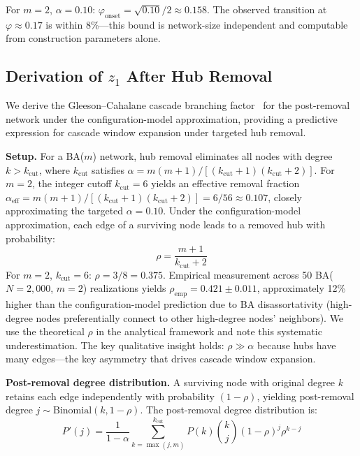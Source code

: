 \documentclass[aps,pre,twocolumn,superscriptaddress,showpacs]{revtex4-2}
\newcommand{\kcut}{k_{\text{cut}}}
\begin{document}
For $m=2$, $\alpha=0.10$: $\varphi_{\mathrm{onset}} = \sqrt{0.10}/2 \approx 0.158$. The observed transition at $\varphi \approx 0.17$ is within 8\%---this bound is network-size independent and computable from construction parameters alone.

\subsection{Derivation of $z_1$ After Hub Removal}
\label{sec:z1}

We derive the Gleeson--Cahalane cascade branching factor~\cite{Gleeson2007} for the post-removal network under the configuration-model approximation, providing a predictive expression for cascade window expansion under targeted hub removal.

\textbf{Setup.} For a BA($m$) network, hub removal eliminates all nodes with degree $k > \kcut$, where $\kcut$ satisfies $\alpha = m(m+1)/[(\kcut+1)(\kcut+2)]$. For $m=2$, the integer cutoff $\kcut = 6$ yields an effective removal fraction $\alpha_{\mathrm{eff}} = m(m+1)/[(\kcut+1)(\kcut+2)] = 6/56 \approx 0.107$, closely approximating the targeted $\alpha = 0.10$. Under the configuration-model approximation, each edge of a surviving node leads to a removed hub with probability:
\begin{equation}
\rho = \frac{m+1}{\kcut + 2}
\label{eq:rho}
\end{equation}
For $m=2$, $\kcut=6$: $\rho = 3/8 = 0.375$. Empirical measurement across 50 BA($N=2{,}000$, $m=2$) realizations yields $\rho_{\mathrm{emp}} = 0.421 \pm 0.011$, approximately 12\% higher than the configuration-model prediction due to BA disassortativity (high-degree nodes preferentially connect to other high-degree nodes' neighbors). We use the theoretical $\rho$ in the analytical framework and note this systematic underestimation. The key qualitative insight holds: $\rho \gg \alpha$ because hubs have many edges---the key asymmetry that drives cascade window expansion.

\textbf{Post-removal degree distribution.} A surviving node with original degree $k$ retains each edge independently with probability $(1-\rho)$, yielding post-removal degree $j \sim \mathrm{Binomial}(k, 1-\rho)$. The post-removal degree distribution is:
\begin{equation}
P'(j) = \frac{1}{1-\alpha} \sum_{k=\max(j,m)}^{\kcut} P(k) \binom{k}{j} (1-\rho)^j \rho^{k-j}
\label{eq:pprime}
\end{equation}
\end{document}
